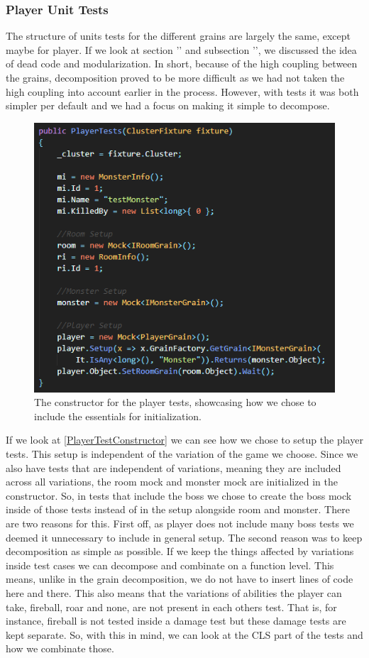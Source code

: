 \subsubsection{Player Unit Tests}
The structure of units tests for the different grains are largely the same, except maybe for player. If we look at section '' and subsection '', we discussed the idea of dead code and modularization. In short, because of the high coupling between the grains, decomposition proved to be more difficult as we had not taken the high coupling into account earlier in the process. However, with tests it was both simpler per default and we had a focus on making it simple to decompose. \\
\begin{figure}[h]
    \centering
    \includegraphics[width=0.7\linewidth]{Materials/TestingDiscussion/PlayerTestConstructor}
    \caption{The constructor for the player tests, showcasing how we chose to include the essentials for initialization.}
    \label{PlayerTestConstructor}
\end{figure}
If we look at \autoref{PlayerTestConstructor} we can see how we chose to setup the player tests. This setup is independent of the variation of the game we choose. Since we also have tests that are independent of variations, meaning they are included across all variations, the room mock and monster mock are initialized in the constructor. So, in tests that include the boss we chose to create the boss mock inside of those tests instead of in the setup alongside room and monster. There are two reasons for this. First off, as player does not include many boss tests we deemed it unnecessary to include in general setup. The second reason was to keep decomposition as simple as possible. If we keep the things affected by variations inside test cases we can decompose and combinate on a function level. This means, unlike in the grain decomposition, we do not have to insert lines of code here and there. This also means that the variations of abilities the player can take, fireball, roar and none, are not present in each others test. That is, for instance, fireball is not tested inside a damage test but these damage tests are kept separate. So, with this in mind, we can look at the CLS part of the tests and how we combinate those. \\
